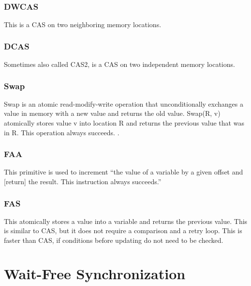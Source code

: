 \subsubsection{\ac{DWCAS}}\label{subsubsec:double-compare-and-swap}
This is a \ac{CAS} on two neighboring memory locations. \cite{Fuchs2014EvaluationOT}

\subsubsection{\ac{DCAS}}\label{subsubsec:double-with-compare-and-swap}
Sometimes also called \ac{CAS}2, is a \ac{CAS} on two independent memory locations. \cite{Fuchs2014EvaluationOT}

\subsubsection{Swap}\label{subsubsec:swap}
Swap is an atomic read-modify-write operation that unconditionally exchanges a value in memory with a new value and returns the old value. Swap(R, v) atomically stores value v into location R and returns the previous value that was in R. This operation always succeeds. \cite{Mateíspmc}.

\subsubsection{\acf{FAA}}\label{subsubsec:fetch-and-add}
This primitive is used to increment \enquote{the value of a variable by a given offset and [return] the result. This instruction always succeeds.} \cite{Fuchs2014EvaluationOT}

\subsubsection{\ac{FAS}}\label{subsubsec:fetch-and-store}
This atomically stores a value into a variable and returns the previous value. This is similar to \ac{CAS}, but it does not require a comparison and a retry loop. This is faster than \ac{CAS}, if conditions before updating do not need to be checked. \cite{Drescher2015GuardedSections}

\section{Wait-Free Synchronization}\label{sec:wait-free}

